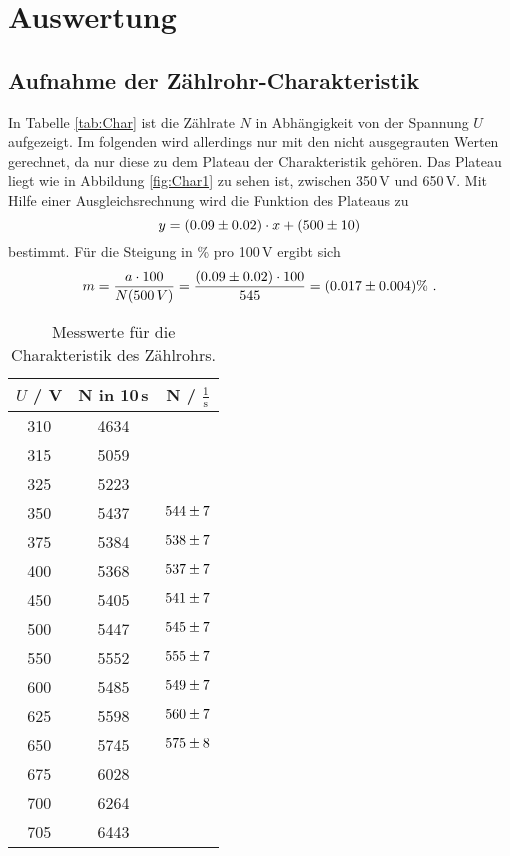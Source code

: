 \section{Auswertung}
\label{sec:Auswertung}

\subsection{Aufnahme der Zählrohr-Charakteristik}
In Tabelle \eqref{tab:Char} ist die Zählrate $N$ in Abhängigkeit von der Spannung $U$ aufgezeigt. Im folgenden wird allerdings nur mit den nicht ausgegrauten Werten gerechnet, da nur diese zu dem Plateau der Charakteristik gehören. Das Plateau liegt wie in Abbildung \eqref{fig:Char1} zu sehen ist, zwischen 350\,V und 650\,V. Mit Hilfe einer Ausgleichsrechnung wird die Funktion des Plateaus zu
\begin{equation*}
  y = (\num{0.09 +- 0.02}) \cdot x + (\num{500 +- 10})
\end{equation*}
bestimmt. Für die Steigung in \% pro 100\,V ergibt sich
\begin{equation*}
  m = \frac{a\cdot100}{N(500\,V)} = \frac{(\num{0.09 +- 0.02})\cdot100}{545} = (\num{0.017 +- 0.004})\% \ .
\end{equation*}

\begin{table}[H]
  \centering
  \begin{tabular}{c|c|c}
    \hline
    $U$ / V & N in 10\,s & N / $\frac{1}{\text{s}}$ \\
    \hline
    \rowcolor{lightgray} 310 & 4634 & \\
    \rowcolor{lightgray} 315 & 5059 & \\
    \rowcolor{lightgray} 325 & 5223 & \\
    \hline
    \hline
    350 & 5437 & $\num{544 +- 7}$ \\
    375 & 5384 & $\num{538 +- 7}$ \\
    400 & 5368 & $\num{537 +- 7}$ \\
    450 & 5405 & $\num{541 +- 7}$ \\
    500 & 5447 & $\num{545 +- 7}$ \\
    550 & 5552 & $\num{555 +- 7}$ \\
    600 & 5485 & $\num{549 +- 7}$ \\
    625 & 5598 & $\num{560 +- 7}$ \\
    650 & 5745 & $\num{575 +- 8}$ \\
    \hline
    \hline
    \rowcolor{lightgray} 675 & 6028 & \\
    \rowcolor{lightgray} 700 & 6264 & \\
    \rowcolor{lightgray} 705 & 6443 & \\
    \hline
  \end{tabular}
  \caption{Messwerte für die Charakteristik des Zählrohrs.}
  \label{tab:Char}
\end{table}

